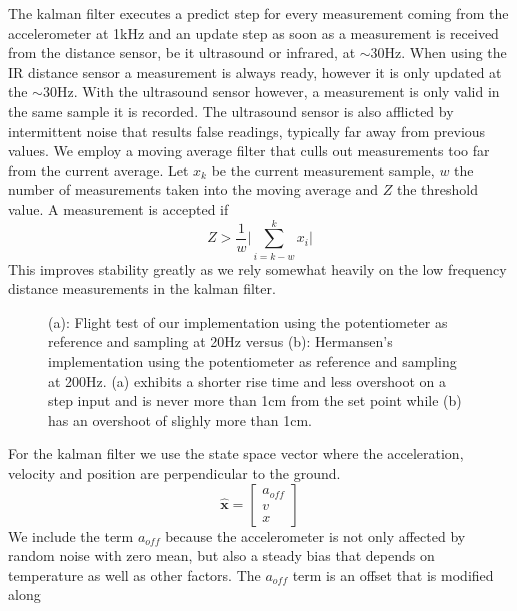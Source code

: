 The kalman filter executes a predict step for every measurement coming from the accelerometer at 1kHz and an update step as soon 
as a measurement is received from the distance sensor, be it ultrasound or infrared, at \(\sim\)30Hz. When using the IR distance 
sensor a measurement is always ready, however it is only updated at the \(\sim\)30Hz. With the ultrasound sensor however, a measurement
is only valid in the same sample it is recorded. The ultrasound sensor is also afflicted by intermittent noise that results false readings,
typically far away from previous values. We employ a moving average filter that culls out measurements too far from the current average.
Let \(x_k\) be the current measurement sample, \(w\) the number of measurements taken into the moving average and \(Z\) the threshold value.
A measurement is accepted if 
\begin{equation*}
	Z >\frac{1}{w} \lvert \sum_{i=k-w}^{k}x_i \rvert
\end{equation*}
This improves stability greatly as we rely somewhat heavily on the low frequency distance measurements in the kalman filter.
\begin{figure}
	\centering
	\subfloat[][]{\newlength\figureheight
		\newlength\figurewidth
		\setlength\figureheight{4cm}
		\setlength\figurewidth{7cm}
		
	}
	\subfloat[][]{\setlength\figureheight{4cm}
		\setlength\figurewidth{7cm}
		
	}
	\caption{(a): Flight test of our implementation using the potentiometer as reference and sampling at 20Hz versus (b):
	Hermansen's implementation using the potentiometer as reference and sampling at 200Hz. (a) exhibits a shorter rise time and less
	overshoot on a step input and is never more than 1cm from the set point while (b) has an overshoot of slighly more than 1cm.}
	\label{fig:pottest}
	\hrulefill
\end{figure}
For the kalman filter we use the state space vector where the acceleration, velocity and position are perpendicular to the ground.
\begin{equation*}
	\hat{\mathbf{x}} = \begin{bmatrix}
		a_{off} \\
		v \\
		x
	\end{bmatrix}
\end{equation*}
We include the term \(a_{off}\) because the accelerometer is not only affected by random noise with zero mean, but also a 
steady bias that depends on temperature as well as other factors. The \(a_{off}\) term is an offset that is modified along
